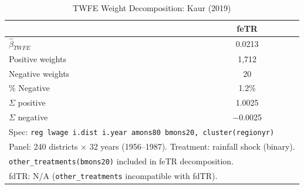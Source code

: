 \begin{table}[htbp]
\centering
\caption{TWFE Weight Decomposition: Kaur (2019)}
\label{tab:kaur_weights}
\begin{tabular}{lc}
\hline\hline
 & feTR \\
\hline
$\hat{\beta}_{TWFE}$ & 0.0213 \\
Positive weights & 1,712 \\
Negative weights & 20 \\
\% Negative & 1.2\% \\
$\Sigma$ positive & 1.0025 \\
$\Sigma$ negative & $-$0.0025 \\
\hline
\multicolumn{2}{l}{\footnotesize Spec: \texttt{reg lwage i.dist i.year amons80 bmons20, cluster(regionyr)}} \\
\multicolumn{2}{l}{\footnotesize Panel: 240 districts $\times$ 32 years (1956--1987). Treatment: rainfall shock (binary).} \\
\multicolumn{2}{l}{\footnotesize \texttt{other\_treatments(bmons20)} included in feTR decomposition.} \\
\multicolumn{2}{l}{\footnotesize fdTR: N/A (\texttt{other\_treatments} incompatible with fdTR).} \\
\hline\hline
\end{tabular}
\end{table}
